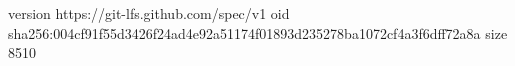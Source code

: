 version https://git-lfs.github.com/spec/v1
oid sha256:004cf91f55d3426f24ad4e92a51174f01893d235278ba1072cf4a3f6dff72a8a
size 8510
